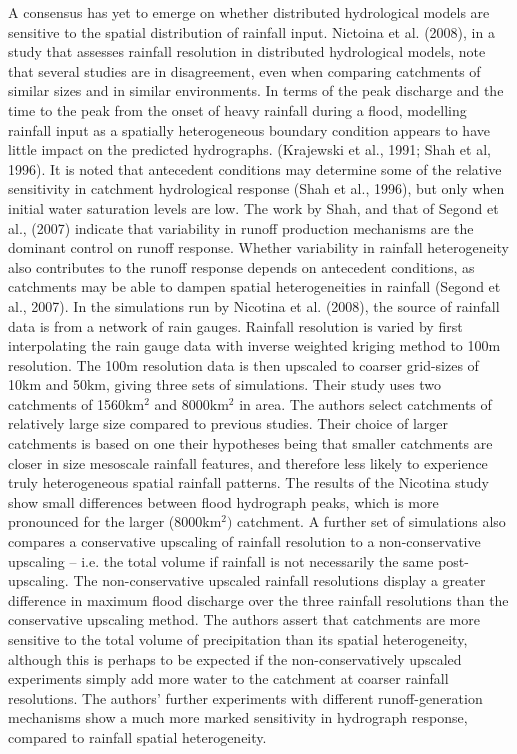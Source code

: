 A consensus has yet to emerge on whether distributed hydrological models are sensitive to the spatial distribution of rainfall input. Nictoina et al. (2008), in a study that assesses rainfall resolution in distributed hydrological models, note that several studies are in disagreement, even when comparing catchments of similar sizes and in similar environments. In terms of the peak discharge and the time to the peak from the onset of heavy rainfall during a flood, modelling rainfall input as a spatially heterogeneous boundary condition appears to have little impact on the predicted hydrographs.  (Krajewski et al., 1991; Shah et al, 1996). It is noted that antecedent conditions may determine some of the relative sensitivity in catchment hydrological response (Shah et al., 1996), but only when initial water saturation levels are low. The work by Shah, and that of Segond et al., (2007) indicate that variability in runoff production mechanisms are the dominant control on runoff response. Whether variability in rainfall heterogeneity also contributes to the runoff response depends on antecedent conditions, as catchments may be able to dampen spatial heterogeneities in rainfall (Segond et al., 2007). In the simulations run by Nicotina et al. (2008), the source of rainfall data is from a network of rain gauges. Rainfall resolution is varied by first interpolating the rain gauge data with inverse weighted kriging method to 100m resolution. The 100m resolution data is then upscaled to coarser grid-sizes of 10km and 50km, giving three sets of simulations. Their study uses two catchments of 1560km\(^2\) and 8000km\(^2\) in area. The authors select catchments of relatively large size compared to previous studies. Their choice of larger catchments is based on one their hypotheses being that smaller catchments are closer in size mesoscale rainfall features, and therefore less likely to experience truly heterogeneous spatial rainfall patterns. The results of the Nicotina study show small differences between flood hydrograph peaks, which is more pronounced for the larger (8000km\(^2)\) catchment. A further set of simulations also compares a conservative upscaling of rainfall resolution to a non-conservative upscaling -- i.e. the total volume if rainfall is not necessarily the same post-upscaling. The non-conservative upscaled rainfall resolutions display a greater difference in maximum flood discharge over the three rainfall resolutions than the conservative upscaling method. The authors assert that catchments are more sensitive to the total volume of precipitation than its spatial heterogeneity, although this is perhaps to be expected if the non-conservatively upscaled experiments simply add more water to the catchment at coarser rainfall resolutions. The authors' further experiments with different runoff-generation mechanisms show a much more marked sensitivity in hydrograph response, compared to rainfall spatial heterogeneity. 

